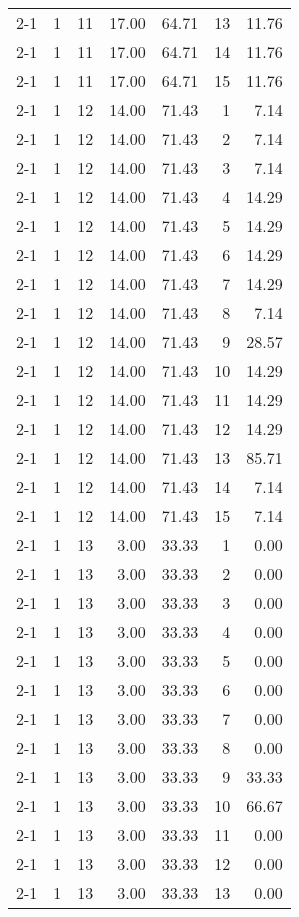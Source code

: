 \begin{tabular}{lrrrrrr}
2-1  & 1 & 11 & 17.00 & 64.71 & 13 & 11.76 \\
2-1  & 1 & 11 & 17.00 & 64.71 & 14 & 11.76 \\
2-1  & 1 & 11 & 17.00 & 64.71 & 15 & 11.76 \\
2-1  & 1 & 12 & 14.00 & 71.43 & 1 & 7.14 \\
2-1  & 1 & 12 & 14.00 & 71.43 & 2 & 7.14 \\
2-1  & 1 & 12 & 14.00 & 71.43 & 3 & 7.14 \\
2-1  & 1 & 12 & 14.00 & 71.43 & 4 & 14.29 \\
2-1  & 1 & 12 & 14.00 & 71.43 & 5 & 14.29 \\
2-1  & 1 & 12 & 14.00 & 71.43 & 6 & 14.29 \\
2-1  & 1 & 12 & 14.00 & 71.43 & 7 & 14.29 \\
2-1  & 1 & 12 & 14.00 & 71.43 & 8 & 7.14 \\
2-1  & 1 & 12 & 14.00 & 71.43 & 9 & 28.57 \\
2-1  & 1 & 12 & 14.00 & 71.43 & 10 & 14.29 \\
2-1  & 1 & 12 & 14.00 & 71.43 & 11 & 14.29 \\
2-1  & 1 & 12 & 14.00 & 71.43 & 12 & 14.29 \\
2-1  & 1 & 12 & 14.00 & 71.43 & 13 & 85.71 \\
2-1  & 1 & 12 & 14.00 & 71.43 & 14 & 7.14 \\
2-1  & 1 & 12 & 14.00 & 71.43 & 15 & 7.14 \\
2-1  & 1 & 13 & 3.00 & 33.33 & 1 & 0.00 \\
2-1  & 1 & 13 & 3.00 & 33.33 & 2 & 0.00 \\
2-1  & 1 & 13 & 3.00 & 33.33 & 3 & 0.00 \\
2-1  & 1 & 13 & 3.00 & 33.33 & 4 & 0.00 \\
2-1  & 1 & 13 & 3.00 & 33.33 & 5 & 0.00 \\
2-1  & 1 & 13 & 3.00 & 33.33 & 6 & 0.00 \\
2-1  & 1 & 13 & 3.00 & 33.33 & 7 & 0.00 \\
2-1  & 1 & 13 & 3.00 & 33.33 & 8 & 0.00 \\
2-1  & 1 & 13 & 3.00 & 33.33 & 9 & 33.33 \\
2-1  & 1 & 13 & 3.00 & 33.33 & 10 & 66.67 \\
2-1  & 1 & 13 & 3.00 & 33.33 & 11 & 0.00 \\
2-1  & 1 & 13 & 3.00 & 33.33 & 12 & 0.00 \\
2-1  & 1 & 13 & 3.00 & 33.33 & 13 & 0.00 \\

\end{tabular}
